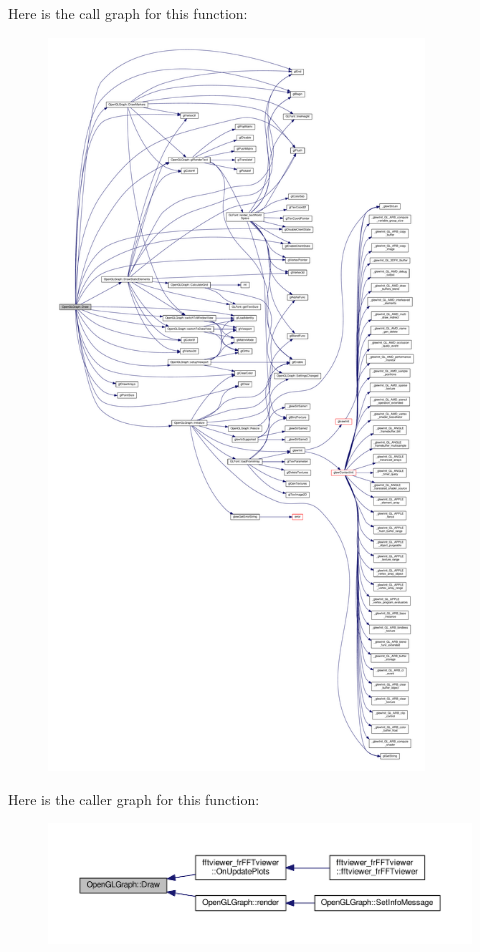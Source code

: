 Here is the call graph for this function\+:
\nopagebreak
\begin{figure}[H]
\begin{center}
\leavevmode
\includegraphics[height=550pt]{d9/d73/classOpenGLGraph_af2f1cb689fb6884d8509877ecdf29fb8_cgraph}
\end{center}
\end{figure}




Here is the caller graph for this function\+:
\nopagebreak
\begin{figure}[H]
\begin{center}
\leavevmode
\includegraphics[width=350pt]{d9/d73/classOpenGLGraph_af2f1cb689fb6884d8509877ecdf29fb8_icgraph}
\end{center}
\end{figure}


